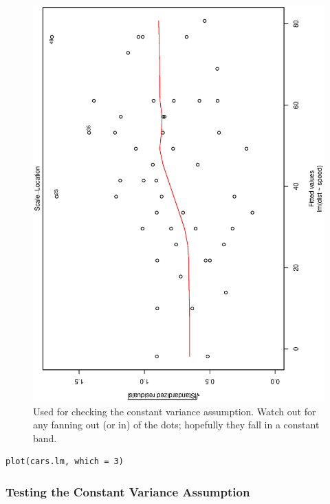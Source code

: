 \documentclass[captions=tableheading]{scrbook}
\begin{document}
\begin{figure}[th]
  \includegraphics[angle=270, totalheight=4in]{ps/slr/std-resids-fitted-cars.ps}
  \caption[Plot of standardized residuals against the fitted values for the \texttt{cars} data]{\small Used for checking the constant variance assumption. Watch out for any fanning out (or in) of the dots; hopefully they fall in a constant band.}
  \label{fig-std-resids-fitted-cars}
\end{figure}



\lstset{language=R}
\begin{lstlisting}
plot(cars.lm, which = 3)
\end{lstlisting}
\subsubsection{Testing the Constant Variance Assumption}
\label{sec-11-4-2-1}
\end{document}
